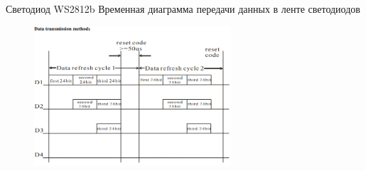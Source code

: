 \begin{frame}{Светодиод WS2812b}
  Временная диаграмма передачи данных в ленте светодиодов
  \begin{figure}[H]
    \centering
    \includegraphics[width=0.65\textwidth]{assets/images/Временная диаграма передачи данных.png}
    \label{img:WS2812__data_transmission}
  \end{figure}
\end{frame}